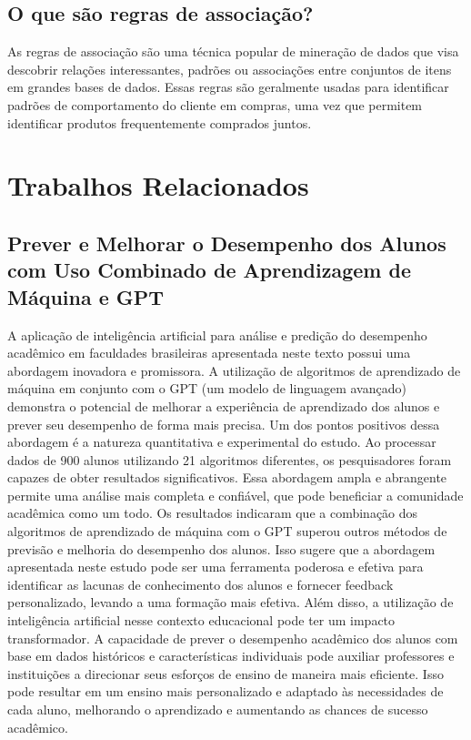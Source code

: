 \documentclass[conference]{IEEEtran}
\begin{document}
\subsection{O que são regras de associação?}
As regras de associação são uma técnica popular de mineração de dados que visa descobrir relações interessantes, padrões ou associações entre conjuntos de itens em grandes bases de dados. Essas regras são geralmente usadas para identificar padrões de comportamento do cliente em compras, uma vez que permitem identificar produtos frequentemente comprados juntos.

\section{Trabalhos Relacionados}
\subsection{Prever e Melhorar o Desempenho dos Alunos com Uso Combinado de Aprendizagem de Máquina e GPT\cite{b1}}
A aplicação de inteligência artificial para análise e predição do desempenho acadêmico em faculdades brasileiras apresentada neste texto possui uma abordagem inovadora e promissora. A utilização de algoritmos de aprendizado de máquina em conjunto com o GPT (um modelo de linguagem avançado) demonstra o potencial de melhorar a experiência de aprendizado dos alunos e prever seu desempenho de forma mais precisa.
Um dos pontos positivos dessa abordagem é a natureza quantitativa e experimental do estudo. Ao processar dados de 900 alunos utilizando 21 algoritmos diferentes, os pesquisadores foram capazes de obter resultados significativos. Essa abordagem ampla e abrangente permite uma análise mais completa e confiável, que pode beneficiar a comunidade acadêmica como um todo.
Os resultados indicaram que a combinação dos algoritmos de aprendizado de máquina com o GPT superou outros métodos de previsão e melhoria do desempenho dos alunos. Isso sugere que a abordagem apresentada neste estudo pode ser uma ferramenta poderosa e efetiva para identificar as lacunas de conhecimento dos alunos e fornecer feedback personalizado, levando a uma formação mais efetiva.
Além disso, a utilização de inteligência artificial nesse contexto educacional pode ter um impacto transformador. A capacidade de prever o desempenho acadêmico dos alunos com base em dados históricos e características individuais pode auxiliar professores e instituições a direcionar seus esforços de ensino de maneira mais eficiente. Isso pode resultar em um ensino mais personalizado e adaptado às necessidades de cada aluno, melhorando o aprendizado e aumentando as chances de sucesso acadêmico.
\end{document}
